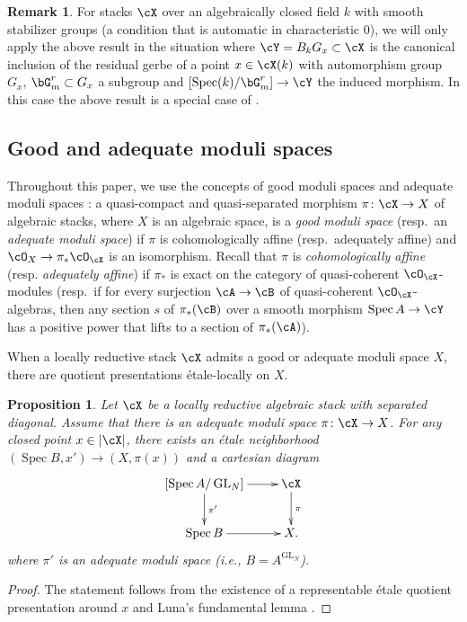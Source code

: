 \documentclass[a4paper]{amsart}
\numberwithin{equation}{section}
\theoremstyle{plain}
\newtheorem{prop}[thm]{Proposition}
\theoremstyle{definition}
\newtheorem{remark}[thm]{Remark}
\DeclareMathOperator{\Spec}{Spec}
\DeclareMathOperator{\GL}{GL}
\newcommand{\co}{\colon}
\newcommand{\oh}{\cO}
\begin{document}
\begin{remark}
{For stacks $\cX$ over an algebraically closed field $k$ with smooth stabilizer groups (a condition that is automatic in characteristic $0$), we will only apply the above result in the situation where $\cY=B_k G_x \subset \cX$ is the canonical inclusion of the residual gerbe of a point $x \in \cX(k)$ with automorphism group $G_x$, $\bG_m^r\subset G_x$ a subgroup and $[\Spec(k)/\bG_m^r] \to \cY$ the induced morphism. In this case the above result is a special case of \cite[Thm.~1.1]{ahr}.}
\end{remark}

\subsection{Good and adequate moduli spaces}
Throughout this paper, we use the concepts of good moduli spaces \cite[Defn.\ 4.1]{alper-good} and adequate moduli spaces \cite[Defn.\ 5.1.1]{alper-adequate}: a quasi-compact and quasi-separated morphism $\pi \co \cX \to X$ of algebraic stacks, where $X$ is an algebraic space, is a {\it good moduli space} (resp.\ an {\it adequate moduli space}) if $\pi$ is cohomologically affine (resp.\ adequately affine) and $\oh_X \to \pi_* \oh_{\cX}$ is an isomorphism.  Recall that $\pi$ is \emph{cohomologically affine} (resp. \emph{adequately affine}) if $\pi_*$ is exact on the category of quasi-coherent $\oh_{\cX}$-modules (resp.\ if for every surjection $\cA \to \cB$ of quasi-coherent $\oh_{\cX}$-algebras, then any section $s$ of $\pi_*(\cB)$ over a smooth morphism $\Spec A \to \cY$ has a positive power that lifts to a section of $\pi_*(\cA)$).

When a locally reductive stack $\cX$ admits a good or adequate moduli space $X$, there are quotient presentations \'etale-local{ly} on $X$.

\begin{prop} \label{P:local-on-ams}
	Let $\cX$ be a locally reductive algebraic stack with separated diagonal. Assume that there is an adequate moduli space $\pi \co \cX \to X$.
	For any closed point $x \in |\cX|$, there exists an \'etale neighborhood $(\Spec B, x') \to (X,\pi(x))$ and a cartesian diagram
	\[
	\xymatrix{
		[\Spec A / \GL_N]\ar[r] \ar[d]^{\pi'}		
			& \cX \ar[d]^{\pi} \\
		\Spec B \ar[r]							& X.
	} 
	\]
	where $\pi'$ is an adequate moduli space (i.e., $B = A^{\GL_N}$). 
\end{prop}

\begin{proof}
The statement follows from the existence of a representable \'etale quotient presentation around $x$ and Luna's fundamental lemma \cite[Thm. 3.14]{ahr2}.
\end{proof}
\end{document}
